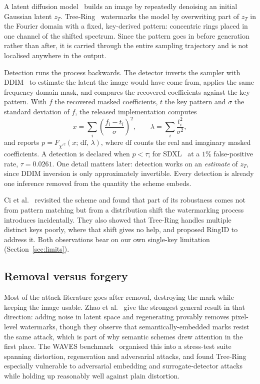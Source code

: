 \documentclass[10pt,twocolumn]{article}
\newcommand{\xstat}{\ensuremath{x}}
\newcommand{\lam}{\ensuremath{\lambda}}
\begin{document}
A latent diffusion model~\cite{rombach2022ldm,ho2020ddpm} builds an image by
repeatedly denoising an initial Gaussian latent $z_T$. Tree-Ring~\cite{wen2023treering} watermarks the
model by overwriting part of $z_T$ in the Fourier domain with a fixed, key-derived
pattern: concentric rings placed in one channel of the shifted spectrum. Since the
pattern goes in before generation rather than after, it is carried through the entire
sampling trajectory and is not localised anywhere in the output.

Detection runs the process backwards. The detector inverts the sampler with
DDIM~\cite{song2021ddim} to estimate the latent the image would have come from,
applies the same frequency-domain mask, and compares the recovered coefficients
against the key pattern. With $f$ the recovered masked coefficients, $t$ the key
pattern and $\sigma$ the standard deviation of $f$, the released implementation
computes
%
\begin{equation}
\xstat = \sum_i \left( \frac{f_i - t_i}{\sigma} \right)^{\!2},
\qquad
\lam = \sum_i \frac{t_i^{2}}{\sigma^{2}},
\label{eq:trstat}
\end{equation}
%
and reports $p = F_{\chi'^2}(\xstat;\, \mathrm{df},\, \lam)$, where $\mathrm{df}$ counts the
real and imaginary masked coefficients. A detection is declared
when $p < \tau$; for SDXL~\cite{podell2024sdxl} at a $1\%$ false-positive rate,
$\tau = 0.0261$. One detail matters later: detection works on an \emph{estimate} of
$z_T$, since DDIM inversion is only approximately invertible. Every detection is
already one inference removed from the quantity the scheme embeds.

Ci et al.~\cite{ci2024ringid} revisited the scheme and found that part of its
robustness comes not from pattern matching but from a distribution shift the
watermarking process introduces incidentally. They also showed that Tree-Ring
handles multiple distinct keys poorly, where that shift gives no help, and proposed
RingID to address it. Both observations bear on our own single-key limitation
(Section~\ref{sec:limits}).

\subsection{Removal versus forgery}

Most of the attack literature goes after removal, destroying the mark while keeping
the image usable. Zhao et al.~\cite{zhao2024removable} give the strongest general
result in that direction: adding noise in latent space and regenerating provably
removes pixel-level watermarks, though they observe that semantically-embedded marks
resist the same attack, which is part of why semantic schemes drew attention in the
first place. The WAVES benchmark~\cite{an2024waves} organised this into a
stress-test suite spanning distortion, regeneration and adversarial attacks, and found
Tree-Ring especially vulnerable to adversarial embedding and surrogate-detector
attacks while holding up reasonably well against plain distortion.
\end{document}

